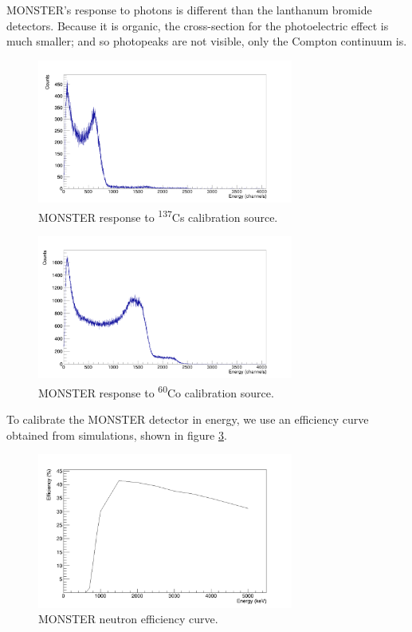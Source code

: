 \documentclass[a4paper,12pt]{report}
\begin{document}
MONSTER's response to photons is different than the lanthanum bromide detectors.
Because it is organic, the cross-section for the photoelectric effect is much smaller; and so photopeaks are not visible, only the Compton continuum is.

\begin{figure}[H]
	\centering
	\includegraphics[width=0.75\textwidth]{monster_cs_calibration.png}
	\caption{MONSTER response to \textsuperscript{137}Cs calibration source.}
	\label{monster_cs_calibration}
\end{figure}

\begin{figure}[H]
	\centering
	\includegraphics[width=0.75\textwidth]{monster_co_calibration.png}
	\caption{MONSTER response to \textsuperscript{60}Co calibration source.}
	\label{monster_co_calibration}
\end{figure}

To calibrate the MONSTER detector in energy, we use an efficiency curve obtained from simulations, shown in figure \ref{monster_efficiency}.	%

\begin{figure}[H]
	\centering
	\includegraphics[width=0.75\textwidth]{monster_efficiency.png}
	\caption{MONSTER neutron efficiency curve.}
	\label{monster_efficiency}
\end{figure}
\end{document}
